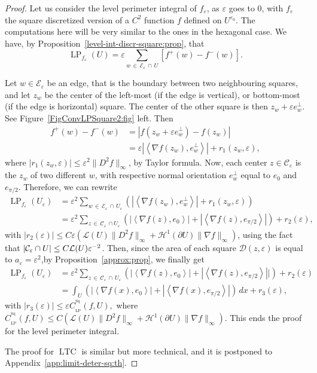 \documentclass[10pt]{amsart}
\theoremstyle{definition}\newtheorem{defi}[theo]{Definition}\newtheorem{rema}[theo]{Remark}\newtheorem{exam}[theo]{Example}\newtheorem{exem}[theo]{Example}\newtheorem{nota}[theo]{Notation}
\newcommand{\eps}{\varepsilon}
\DeclareMathOperator{\LTC}{LTC}
\DeclareMathOperator{\LP}{LP}
\DeclareMathOperator{\Sq}{Sq}
\newcommand{\calH}{\mathcal{H}}
\newcommand{\calL}{\mathcal{L}}
\newcommand{\calC}{\mathcal{C}}
\newcommand{\calD}{\mathcal{D}}
\newcommand{\calE}{\mathcal{E}}
\begin{document}
\begin{proof}
Let us consider the level perimeter integral of $f_\eps$, as $\eps$ goes to $0$, with $f_\eps$ the square discretized version of a $C^2$ function $f$ defined on $U^{\eps_0}$. The computations here will be very similar to the ones in the hexagonal case. We have, by Proposition~\ref{level-int-discr-square:prop}, that
\[
\LP_{f_\eps}(U) = \eps \sum_{w\,\in\,\calE_\eps\,\cap\,U}\left[f^+(w) - f^-(w)\right].
\]

Let $w\in\calE_\eps$ be an edge, that is the boundary between two neighbouring squares, and let $z_w$ be the center of the left-most (if the edge is vertical), or bottom-most (if the edge is horizontal) square. The center of the other square is then $z_w+\eps e_w^\perp$. See Figure~\ref{FigConvLPSquare2:fig} left. Then
\begin{align*}
f^+(w) - f^-(w) & = \left| f\left(z_w+\eps e_w^\perp\right) - f(z_w)\right|
\\
& = \eps \left|\left\langle \nabla f(z_w),e_w^\perp\right\rangle\right| + r_1(z_w,\eps),
\end{align*}
where $|r_1(z_w,\eps)|\leq \eps^2 \|D^2f\|_\infty$, by Taylor formula. Now, each center $z\in\calC_\eps$ is the $z_w$ of two different $w$, with respective normal orientation $e_w^\perp$ equal to $e_{0}$ and $e_{\pi/2}$. Therefore, we can rewrite
\begin{align*}
\LP_{f_\eps}(U_\eps) & = \eps^2 \sum_{w\,\in\,\calE_\eps\,\cap\,U_\eps} \left(\left|\left\langle \nabla f(z_w),e_w^\perp\right\rangle\right| + r_1(z_w,\eps) \right) \\
& = \eps^2 \sum_{z\,\in\,\calC_\eps\,\cap U_\eps} \left(\left|\left\langle \nabla f(z),e_0\right\rangle\right| +\left|\left\langle \nabla f(z),e_{\pi/2}\right\rangle\right|\right) + r_2(\eps),
\end{align*}
with $|r_2(\eps)|\le C\eps \left({\calL}(U) \|D^2 f\|_\infty +{\calH}^1(\partial U)\|\nabla f\|_\infty\right)$, using the fact that $|\calC_\eps \cap U|\linebreak\le C {\calL}(U)
\eps^{-2}$. Then, since the area of each square $\calD(z,\eps)$ is equal to $a_\eps=\eps^2$,\linebreak by Proposition~\ref{approx:prop}, we finally get
\begin{align*}
\LP_{f_\eps}(U_\eps) & = \eps^2 \sum_{z\,\in\,\calC_\eps\,\cap\,U_\eps} \left(\left|\left\langle \nabla f(z),e_0 \right\rangle\right| +\left|\left\langle \nabla f(z),e_{\pi/2} \right\rangle \right||\right) + r_2(\eps) \\
& = \int_U \left(\left|\left\langle
\nabla f(x),e_0\right\rangle\right| +\left|\left\langle \nabla f(x),e_{\pi/2}\right\rangle\right|
\right) \, dx + r_3(\eps),
\end{align*}
with $|r_3(\eps)|\le \eps C_{_{\LP}}^{^{\Sq}}(f,U),$ where $ C_{_{\LP}}^{^{\Sq}}(f,U)\le C \left({\calL}(U) \|D^2 f\|_\infty +{\calH}^1(\partial U)\|\nabla f\|_\infty\right)$. This ends the proof for the level perimeter integral.


The proof for $\LTC$ is similar but more technical, and it is postponed to Appendix~\ref{app:limit-deter-sq:th}.
\end{proof}
\end{document}
